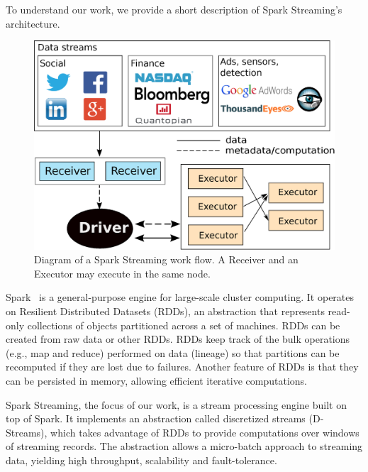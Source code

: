 %
To understand our work, we provide a short description of Spark Streaming's architecture.
\begin{figure}[t!]
  \begin{center}
    \includegraphics[scale=0.35]{images_graphs/spark_architecture_v4.eps}
  \end{center}
  \caption{Diagram of a Spark Streaming work flow. A Receiver and an Executor may execute in the same node.}
  \label{fig:SparkStreaming_architecture}
\end{figure}

Spark~\cite{Spark} is a general-purpose engine for large-scale cluster computing. It operates on Resilient Distributed Datasets (RDDs), an abstraction that represents read-only collections of objects partitioned across a set of machines. RDDs can be created from raw data or other RDDs. 
RDDs keep track of the bulk operations (e.g., map and reduce) performed on data (lineage) so that partitions can be recomputed if they are lost due to failures. 
Another feature of RDDs is that they can be persisted in memory, allowing efficient iterative computations.

Spark Streaming, the focus of our work, is a stream processing engine built on top of Spark.
It implements an abstraction called discretized streams (D-Streams), which takes advantage of RDDs to provide computations over windows of streaming records.
The abstraction allows a micro-batch approach to streaming data, yielding high throughput, scalability and fault-tolerance.



